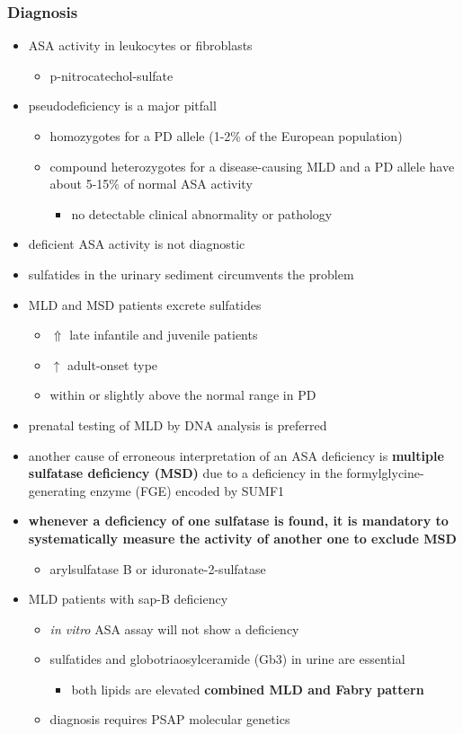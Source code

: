 \documentclass[12pt]{scrartcl}
\begin{document}
\subsubsection{Diagnosis}
\label{sec:org764a50b}
\begin{itemize}
\item ASA activity in leukocytes or fibroblasts
\begin{itemize}
\item p-nitrocatechol-sulfate
\end{itemize}
\item pseudodeficiency is a major pitfall
\begin{itemize}
\item homozygotes for a PD allele (1-2\% of the European population)
\item compound heterozygotes for a disease-causing MLD and a PD allele
have about 5-15\% of normal ASA activity
\begin{itemize}
\item no detectable clinical abnormality or pathology
\end{itemize}
\end{itemize}
\item deficient ASA activity is not diagnostic
\item sulfatides in the urinary sediment circumvents the problem
\item MLD and MSD patients excrete sulfatides
\begin{itemize}
\item \(\Uparrow\) late infantile and juvenile patients
\item \(\uparrow\) adult-onset type
\item within or slightly above the normal range in PD
\end{itemize}
\item prenatal testing of MLD by DNA analysis is preferred
\item another cause of erroneous interpretation of an ASA deficiency is
\textbf{multiple sulfatase deficiency (MSD)} due to a deficiency in the
formylglycine-generating enzyme (FGE) encoded by SUMF1
\item \textbf{whenever a deficiency of one sulfatase is found, it is mandatory to}
\textbf{systematically measure the activity of another one to exclude MSD}
\begin{itemize}
\item arylsulfatase B or iduronate-2-sulfatase
\end{itemize}
\item MLD patients with sap-B deficiency
\begin{itemize}
\item \emph{in vitro} ASA assay will not show a deficiency
\item sulfatides and globotriaosylceramide (Gb3) in urine are essential
\begin{itemize}
\item both lipids are elevated \textbf{combined MLD and Fabry pattern}
\end{itemize}
\item diagnosis requires PSAP molecular genetics
\end{itemize}
\end{itemize}
\end{document}
